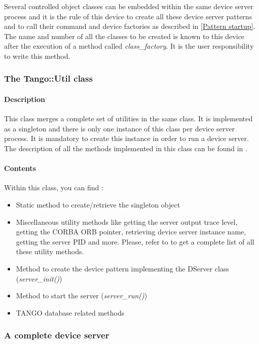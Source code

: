 Several controlled object classes can be embedded within the same
device server process and it is the rule of this device to create
all these device server patterns and to call their command and device
factories as described in \ref{Pattern startup}. The name and number
of all the classes to be created is known to this device after the
execution of a method called \emph{class\_factory}.
It is the user responsibility to write this method.

\subsubsection{The Tango::Util class}

\paragraph{Description}

This class merges a complete set of utilities in the same class. It
is implemented as a singleton and there is only
one instance of this class per device server process. It is mandatory
to create this instance in order to run a device server. The description
of all the methods implemented in this class can be found in \cite{TANGO_ref_man}.

\paragraph{Contents}

Within this class, you can find :
\begin{itemize}
\item Static method to create/retrieve the singleton object
\item Miscellaneous utility methods like getting the server output trace
level, getting the CORBA ORB pointer, retrieving device
server instance name, getting the server PID and more. Please, refer
to \cite{TANGO_ref_man} to get a complete list of all these utility
methods.
\item Method to create the device pattern implementing the DServer class
(\emph{server\_init()})
\item Method to start the server (\emph{server\_run()})
\item TANGO database related methods
\end{itemize}

\subsubsection{A complete device server}


